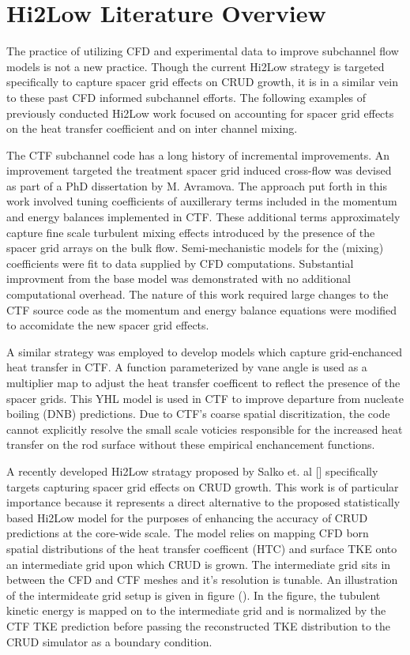 \section{Hi2Low Literature Overview}

The practice of utilizing CFD and experimental data to improve subchannel flow models is not a new practice.  Though the current Hi2Low strategy is targeted specifically to capture spacer grid effects on CRUD growth, it is in a similar vein to these past CFD informed subchannel efforts.  The following examples of previously conducted Hi2Low work focused on accounting for spacer grid effects on the heat transfer coefficient and on inter channel mixing. 

The CTF subchannel code has a long history of incremental improvements.  An improvement targeted the treatment spacer grid induced cross-flow was devised as part of a PhD dissertation by M. Avramova.
The approach put forth in this work involved tuning coefficients of auxillerary terms included in the momentum and energy balances implemented in CTF.  These additional terms approximately capture fine scale turbulent mixing effects introduced by the presence of the spacer grid arrays on the bulk flow.  Semi-mechanistic models for the (mixing) coefficients were fit to data supplied by CFD computations.  Substantial improvment from the base model was demonstrated with no additional computational overhead.  The nature of this work required large changes to the CTF source code as the momentum and energy balance equations were modified to accomidate the new spacer grid effects.  

A similar strategy was employed to develop models which capture grid-enchanced heat transfer in CTF.   A function parameterized by vane angle is used as a multiplier map to adjust the heat transfer coefficent to reflect the presence of the spacer grids.  This YHL model is used in CTF to improve departure from nucleate boiling (DNB) predictions.  Due to CTF's coarse spatial discritization, the code cannot explicitly resolve the small scale voticies responsible for the increased heat transfer on the rod surface without these empirical enchancement functions.   

A recently developed Hi2Low stratagy proposed by Salko et. al [] specifically targets capturing spacer grid effects on CRUD growth.  This work is of particular importance because it represents a direct alternative to the proposed statistically based Hi2Low model for the purposes of enhancing the accuracy of CRUD predictions at the core-wide scale.  The model relies on mapping CFD born spatial distributions of the heat transfer coefficent (HTC) and surface TKE onto an intermediate grid upon which CRUD is grown.  The intermediate grid sits in between the CFD and CTF meshes and it's resolution is tunable.  An illustration of the intermideate grid setup is given in figure ().  In the figure, the tubulent kinetic energy is mapped on to the intermediate grid and is normalized by the CTF TKE prediction before passing the reconstructed TKE distribution to the CRUD simulator as a boundary condition. 

